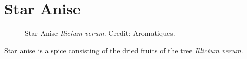 \section{Star Anise}
\label{sec:star_anise}



\begin{figure}[!ht]
	\vspace{-4ex}
	\centering
	\hfill
	\hfill
	\caption{Star Anise \textit{Ilicium verum}. Credit: Aromatiques.}
	\label{fig:star_anise_imgs}
\end{figure}

Star anise is a spice consisting of the dried fruits of the tree \textit{Illicium verum}. 


